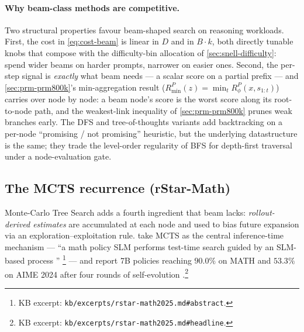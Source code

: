 \paragraph{Why beam-class methods are competitive.} Two structural
properties favour beam-shaped search on reasoning workloads. First,
the cost in \cref{eq:cost-beam} is linear in $D$ and in $B \cdot k$,
both directly tunable knobs that compose with the difficulty-bin
allocation of \cref{sec:snell-difficulty}: spend wider beams on harder
prompts, narrower on easier ones. Second, the per-step  signal is
\emph{exactly} what beam needs --- a scalar score on a partial prefix
--- and \cref{sec:prm-prm800k}'s min-aggregation result
($R^P_\text{min}(z) = \min_t R^P_\phi(x, s_{1:t})$) carries over node
by node: a beam node's score is the worst  score along its
root-to-node path, and the weakest-link inequality of
\cref{sec:prm-prm800k} prunes weak branches early. The DFS and
tree-of-thoughts variants
add backtracking on a per-node ``promising / not promising''
heuristic, but the underlying datastructure is the same; they trade
the level-order regularity of BFS for depth-first traversal under a
node-evaluation gate.

\subsection{The MCTS recurrence (rStar-Math)}
\label{sec:tree-mcts}

Monte-Carlo Tree Search adds a fourth ingredient that beam lacks:
\emph{rollout-derived  estimates} are accumulated at each node and
used to bias future expansion via an exploration--exploitation rule.
\citet{rstar-math2025} take MCTS as the central inference-time
mechanism --- ``a math policy SLM performs test-time search guided by
an SLM-based process ''
\citep[abstract]{rstar-math2025}\footnote{KB excerpt:
\texttt{kb/excerpts/rstar-math2025.md\#abstract}.} --- and report 7B
policies reaching $90.0\%$ on MATH and $53.3\%$ on AIME 2024 after
four rounds of self-evolution
\citep[headline numbers]{rstar-math2025}.\footnote{KB excerpt:
\texttt{kb/excerpts/rstar-math2025.md\#headline}.}

